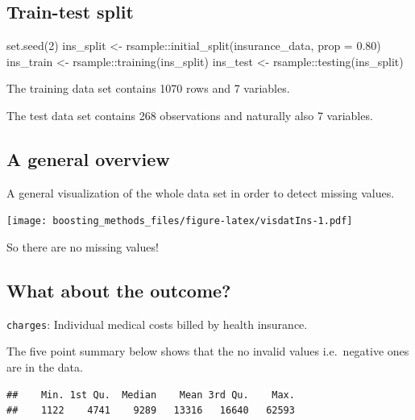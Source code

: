 \documentclass[
]{book}
\newenvironment{Shaded}{\begin{snugshade}}{\end{snugshade}}
\newcommand{\AttributeTok}[1]{\textcolor[rgb]{0.77,0.63,0.00}{#1}}
\newcommand{\DecValTok}[1]{\textcolor[rgb]{0.00,0.00,0.81}{#1}}
\newcommand{\FloatTok}[1]{\textcolor[rgb]{0.00,0.00,0.81}{#1}}
\newcommand{\FunctionTok}[1]{\textcolor[rgb]{0.00,0.00,0.00}{#1}}
\newcommand{\NormalTok}[1]{#1}
\newcommand{\OtherTok}[1]{\textcolor[rgb]{0.56,0.35,0.01}{#1}}
\newcommand{\SpecialCharTok}[1]{\textcolor[rgb]{0.00,0.00,0.00}{#1}}
\begin{document}
\hypertarget{train-test-split-1}{%
\subsection{Train-test split}\label{train-test-split-1}}

\begin{Shaded}
\begin{Highlighting}[]
\FunctionTok{set.seed}\NormalTok{(}\DecValTok{2}\NormalTok{)}
\NormalTok{ins\_split }\OtherTok{\textless{}{-}}\NormalTok{ rsample}\SpecialCharTok{::}\FunctionTok{initial\_split}\NormalTok{(insurance\_data, }\AttributeTok{prop =} \FloatTok{0.80}\NormalTok{)}
\NormalTok{ins\_train }\OtherTok{\textless{}{-}}\NormalTok{ rsample}\SpecialCharTok{::}\FunctionTok{training}\NormalTok{(ins\_split)}
\NormalTok{ins\_test  }\OtherTok{\textless{}{-}}\NormalTok{ rsample}\SpecialCharTok{::}\FunctionTok{testing}\NormalTok{(ins\_split)}
\end{Highlighting}
\end{Shaded}

The training data set contains 1070 rows and 7 variables.

The test data set contains 268 observations and naturally also 7 variables.

\hypertarget{a-general-overview}{%
\subsection{A general overview}\label{a-general-overview}}

A general visualization of the whole data set in order to detect missing values.

\texttt{[image: boosting\_methods\_files/figure-latex/visdatIns-1.pdf]}

So there are no missing values!

\hypertarget{what-about-the-outcome}{%
\subsection{What about the outcome?}\label{what-about-the-outcome}}

\texttt{charges}: Individual medical costs billed by health insurance.

The five point summary below shows that the no invalid values i.e.~negative ones are in the data.

\begin{verbatim}
##    Min. 1st Qu.  Median    Mean 3rd Qu.    Max. 
##    1122    4741    9289   13316   16640   62593
\end{verbatim}
\end{document}
